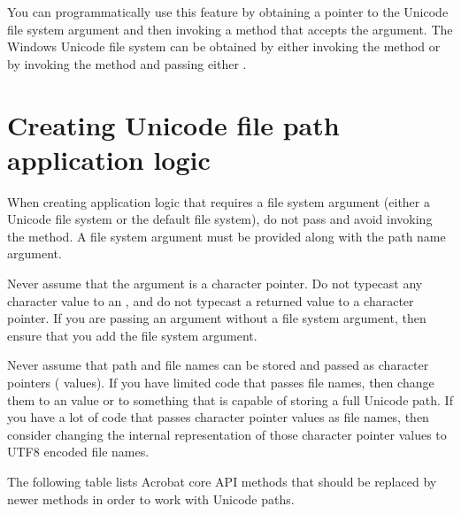 \documentclass[letterpaper,12pt,english,openany,oneside]{sphinxmanual}
\begin{document}
You can programmatically use this feature by obtaining a pointer to the Unicode file system  argument and then invoking a method that accepts the  argument. The Windows Unicode file system can be obtained by either invoking the  method or by invoking the  method and passing either .


\section{Creating Unicode file path application logic}
\label{\detokenize{Plugins_Unicode:creating-unicode-file-path-application-logic}}
When creating application logic that requires a file system argument (either a Unicode file system or the default file system), do not pass  and avoid invoking the  method. A file system argument must be provided along with the path name argument.

Never assume that the  argument is a character pointer. Do not typecast any character value to an , and do not typecast a returned  value to a character pointer. If you are passing an  argument without a file system argument, then ensure that you add the file system argument.

Never assume that path and file names can be stored and passed as character pointers ( \sphinxcode{\sphinxupquote{*}} values). If you have limited code that passes file names, then change them to an  value or to something that is capable of storing a full Unicode path. If you have a lot of code that passes character pointer values as file names, then consider changing the internal representation of those character pointer values to UTF\sphinxhyphen{}8 encoded file names.

The following table lists Acrobat core API methods that should be replaced by newer methods in order to work with Unicode paths.
\end{document}
